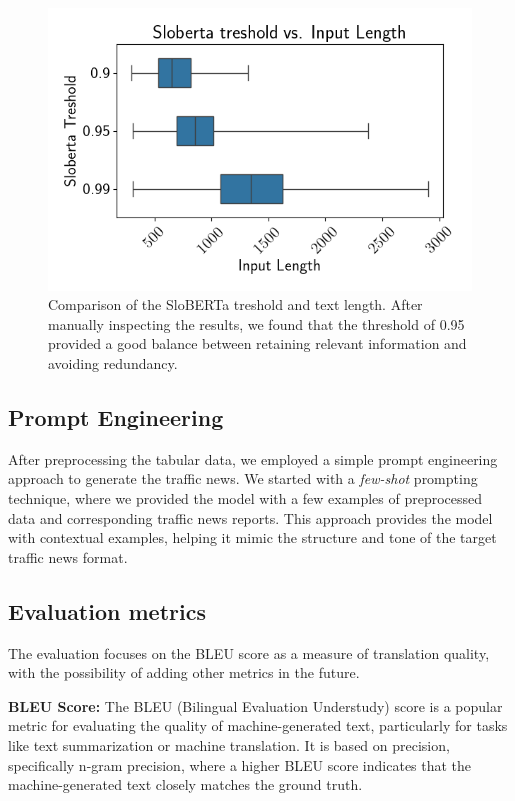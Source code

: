 \documentclass[fleqn,moreauthors,10pt]{ds_report}
\begin{document}
\begin{figure}[h]
    \centering
    \includegraphics[width=0.8\linewidth]{fig/treshold_vs_len.png}
    \caption{Comparison of the SloBERTa treshold and text length. After manually inspecting the results, we found that the threshold of 0.95 provided a good balance between retaining relevant information and avoiding redundancy.}
    \label{fig:preprocessing}
\end{figure}



\subsection*{Prompt Engineering}

After preprocessing the tabular data, we employed a simple prompt engineering approach to generate the traffic news.
We started with a \textit{few-shot} prompting \cite{promptingguide_fewshot} technique, where we provided the model
with a few examples of preprocessed data and corresponding traffic news reports. This approach provides the model
with contextual examples, helping it mimic the structure and tone of the target traffic news format.

\subsection*{Evaluation metrics}

The evaluation focuses on the BLEU score as a measure of translation quality, with the possibility of adding other metrics in the future.

\noindent \textbf{BLEU Score:} The BLEU (Bilingual Evaluation Understudy) score is a popular metric for evaluating the quality of machine-generated text, particularly for tasks like text summarization or machine translation. It is based on precision, specifically n-gram precision, where a higher BLEU score indicates that the machine-generated text closely matches the ground truth.
\end{document}

